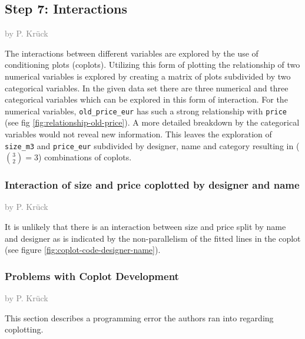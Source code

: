 \documentclass[a4paper, nobind]{templates/ociamthesis}
\begin{document}
\hypertarget{step-7-interactions}{%
\subsection{Step 7: Interactions}\label{step-7-interactions}}

\textcolor{gray}{by P. Krück}

The interactions between different variables are explored by the use of conditioning plots (coplots).
Utilizing this form of plotting the relationship of two numerical variables is explored by creating a matrix of plots subdivided by two categorical variables.
In the given data set there are three numerical and three categorical variables which can be explored in this form of interaction. For the numerical variables, \texttt{old\_price\_eur} has such a strong relationship with \texttt{price} (see fig \ref{fig:relationship-old-price}). A more detailed breakdown by the categorical variables would not reveal new information. This leaves the exploration of \texttt{size\_m3} and \texttt{price\_eur} subdivided by designer, name and category resulting in (\({3 \choose 2} = 3\)) combinations of coplots.

\hypertarget{size-price-interaction}{%
\subsubsection{Interaction of size and price coplotted by designer and name}\label{size-price-interaction}}

\textcolor{gray}{by P. Krück}

It is unlikely that there is an interaction between size and price split by name and designer as is indicated by the non-parallelism of the fitted lines in the coplot (see figure \ref{fig:coplot-code-designer-name}).

\hypertarget{problems-with-coplot-development}{%
\subsubsection{Problems with Coplot Development}\label{problems-with-coplot-development}}

\textcolor{gray}{by P. Krück}

This section describes a programming error the authors ran into regarding coplotting.
\end{document}
